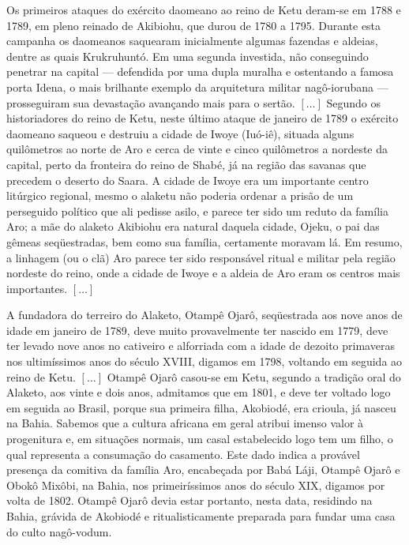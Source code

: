 \begin{citacao}
Os primeiros ataques do exército daomeano ao reino de Ketu deram-se em 1788 e 1789, em pleno reinado de Akibiohu, que durou de 1780 a 1795. Durante esta campanha os daomeanos saquearam inicialmente algumas fazendas e aldeias, dentre as quais Krukruhuntó. Em uma segunda investida, não conseguindo penetrar na capital — defendida por uma dupla muralha e ostentando a famosa porta Idena, o mais brilhante exemplo da arquitetura militar nagô-iorubana — prosseguiram sua devastação avançando mais para o sertão. \([\dots]\) Segundo os historiadores do reino de Ketu, neste último ataque de janeiro de 1789 o exército daomeano saqueou e destruiu a cidade de Iwoye (Iuó-iê), situada alguns quilômetros ao norte de Aro e cerca de vinte e cinco quilômetros a nordeste da capital, perto da fronteira do reino de Shabé, já na região das savanas que precedem o deserto do Saara. A cidade de Iwoye era um importante centro litúrgico regional, mesmo o alaketu não poderia ordenar a prisão de um perseguido político que ali pedisse asilo, e parece ter sido um reduto da família Aro; a mãe do alaketo Akibiohu era natural daquela cidade, Ojeku, o pai das gêmeas seqüestradas, bem como sua família, certamente moravam lá. Em resumo, a linhagem (ou o clã) Aro parece ter sido responsável ritual e militar pela região nordeste do reino, onde a cidade de Iwoye e a aldeia de Aro eram os centros mais importantes. \([\dots]\)

A fundadora do terreiro do Alaketo, Otampê Ojarô, seqüestrada aos nove anos de idade em janeiro de 1789, deve muito provavelmente ter nascido em 1779, deve ter levado nove anos no cativeiro e alforriada com a idade de dezoito primaveras nos ultimíssimos anos do século XVIII, digamos em 1798, voltando em seguida ao reino de Ketu. \([\dots]\) Otampê Ojarô casou-se em Ketu, segundo a tradição oral do Alaketo, aos vinte e dois anos, admitamos que em 1801, e deve ter voltado logo em seguida ao Brasil, porque sua primeira filha, Akobiodé, era crioula, já nasceu na Bahia. Sabemos que a cultura africana em geral atribui imenso valor à progenitura e, em situações normais, um casal estabelecido logo tem um filho, o qual representa a consumação do casamento. Este dado indica a provável presença da comitiva da família Aro, encabeçada por Babá Láji, Otampê Ojarô e Obokô Mixôbi, na Bahia, nos primeiríssimos anos do século XIX, digamos por volta de 1802. Otampê Ojarô devia estar portanto, nesta data, residindo na Bahia, grávida de Akobiodé e ritualisticamente preparada para fundar uma casa do culto nagô-vodum.


\end{citacao}
